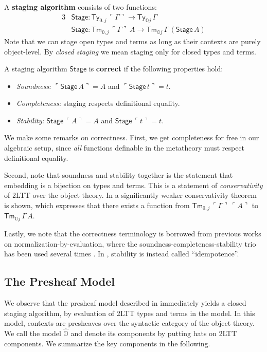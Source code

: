 \documentclass[acmsmall]{acmart}
\newcommand{\msf}[1]{\mathsf{#1}}
\newcommand{\mbb}[1]{\mathbb{#1}}
\newcommand{\mbbo}{\mbb{O}}
\newcommand{\Ty}{\msf{Ty}}
\newcommand{\Tm}{\msf{Tm}}
\newcommand{\emb}[1]{\ulcorner#1\urcorner}
\newcommand{\Stage}{\msf{Stage}}
\newcommand{\hato}{\bm\hat{\mbbo}}
\theoremstyle{remark}
\begin{document}
\begin{definition}
A \textbf{staging algorithm} consists of two functions:
  \begin{alignat*}{3}
    & \Stage : \Ty_{0,j}\,\emb{\Gamma} \to \Ty_{\mbbo j}\,\Gamma \\
    & \Stage : \Tm_{0,j}\,\emb{\Gamma}\,A \to \Tm_{\mbbo j}\,\Gamma\,(\Stage\,A)
  \end{alignat*}
Note that we can stage open types and terms as long as their contexts are purely
object-level. By \emph{closed staging} we mean staging only for closed types and
terms.
\end{definition}
\begin{definition}
  A staging algorithm $\Stage$ is \textbf{correct} if the following properties hold:
  \begin{itemize}
  \item \emph{Soundness:} $\emb{\Stage\,A} = A$ and $\emb{\Stage\,t} = t$.
  \item \emph{Completeness:} staging respects definitional equality.
  \item \emph{Stability:} $\Stage\,\emb{A} = A$ and $\Stage\,\emb{t} = t$.
  \end{itemize}
\end{definition}
We make some remarks on correctness. First, we get completeness for free in our
algebraic setup, since \emph{all} functions definable in the metatheory must
respect definitional equality.

Second, note that soundness and stability together is the statement that
embedding is a bijection on types and terms. This is a statement of
\emph{conservativity} of 2LTT over the object theory. In \cite{TODO} a
significantly weaker conservativity theorem is shown, which expresses that there
exists a function from $\Tm_{0,j}\,\emb{\Gamma}\,\emb{A}$ to $\Tm_{\mbbo
  j}\,\Gamma\,A$.

Lastly, we note that the correctness terminology is borrowed from previous works
on normalization-by-evaluation, where the soundness-completeness-stability trio
has been used several times \cite{TODO}. In \cite{cubicalnbe}, stability is
instead called ``idempotence''.

\subsection{The Presheaf Model}

We observe that the presheaf model described in \cite[Section~2.5.3]{twolevel}
immediately yields a closed staging algorithm, by evaluation of 2LTT types and
terms in the model. In this model, contexts are presheaves over the syntactic
category of the object theory. We call the model $\hato$ and denote its
components by putting hats on 2LTT components. We summarize the key components
in the following.
\end{document}
